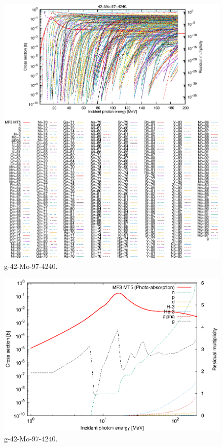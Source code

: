 \begin{figure}
 \includegraphics[width=\linewidth]{eps/g_42-Mo-97_4240.eps}
  \caption{g-42-Mo-97-4240.}
\end{figure}
\newpage \clearpage

\begin{figure}
 \includegraphics[width=\linewidth]{eps-log/g_42-Mo-97_4240.eps}
 \caption{g-42-Mo-97-4240.}
\end{figure}
\newpage \clearpage

